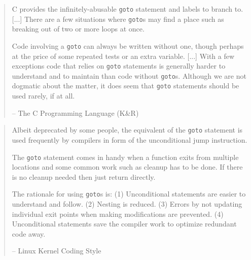 \documentclass[compress]{beamer}
\begin{document}
\begin{slide}
	\begin{quotation} \scriptsize \normalfont

	C provides the infinitely-abusable \texttt{goto} statement and labels to branch to.
	[...]
	There are a few situations where \texttt{goto}s may find a place such as breaking out of two or more loops at once.

	Code involving a \texttt{goto} can always be written without one, though perhaps at the price of some repeated tests or an extra variable.
	[...]
	With a few exceptions code that relies on \texttt{goto} statements is generally harder to understand and to maintain than code without \texttt{goto}s.
	Although we are not dogmatic about the matter, it does seem that \texttt{goto} statements should be used rarely, if at all.

	\begin{flushright}-- The C Programming Language (K\&R)\end{flushright}

	\end{quotation}
\end{slide}

\begin{slide}
	\begin{quotation} \scriptsize \normalfont

	Albeit deprecated by some people, the equivalent of the \texttt{goto} statement is used frequently by compilers in form of the unconditional jump instruction.

	The \texttt{goto} statement comes in handy when a function exits from multiple locations and some common work such as cleanup has to be done.
	If there is no cleanup needed then just return directly.

	The rationale for using \texttt{goto}s is:
	(1) Unconditional statements are easier to understand and follow.
	(2) Nesting is reduced.
	(3) Errors by not updating individual exit points when making modifications are prevented.
	(4) Unconditional statements save the compiler work to optimize redundant code away.

	\begin{flushright}-- Linux Kernel Coding Style\end{flushright}

	\end{quotation}
\end{slide}
\end{document}
